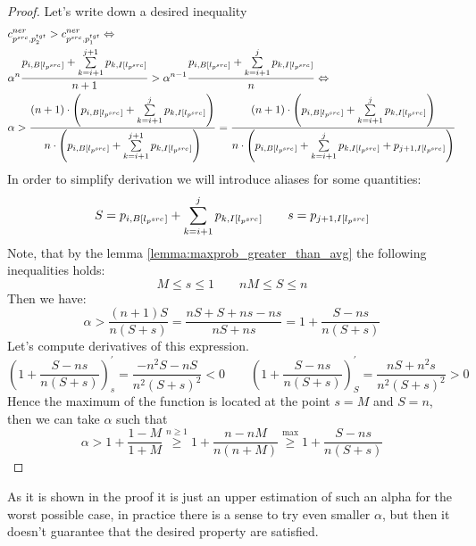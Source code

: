 \begin{proof} Let's write down a desired inequality
  \begin{align*}
    & c_{p^{src}, p_2^{tgt}}^{ner} > c_{p^{src}, p_1^{tgt}}^{ner} \Leftrightarrow \\
    & \alpha^{n}
    \frac{
      p_{i, B[l_{p^{src}}]} +
      \sum\limits_{k = i + 1}^{j + 1} p_{k, I[l_{p^{src}}]}
    }
    {n + 1} >
    \alpha^{n - 1}
    \frac{
      p_{i, B[l_{p^{src}}]} +
      \sum\limits_{k = i + 1}^{j} p_{k, I[l_{p^{src}}]}
    }
    {n}
    \Leftrightarrow                                                                \\
    & \alpha >
    \frac
    {(n+1) \cdot \left( p_{i, B[l_{p^{src}}]} +
    \sum\limits_{k = i + 1}^{j} p_{k, I[l_{p^{src}}]} \right)}
    {
      n \cdot \left( p_{i, B[l_{p^{src}}]} +
    \sum\limits_{k = i + 1}^{j + 1} p_{k, I[l_{p^{src}}]} \right)}
    =
    \frac
    {(n+1) \cdot \left( p_{i, B[l_{p^{src}}]} +
    \sum\limits_{k = i + 1}^{j} p_{k, I[l_{p^{src}}]} \right)}
    {
      n \cdot \left( p_{i, B[l_{p^{src}}]} +
    \sum\limits_{k = i + 1}^{j} p_{k, I[l_{p^{src}}]} + p_{j+1, I[l_{p^{src}}]} \right)}
  \end{align*}
  In order to simplify derivation we will introduce aliases for some quantities:
  \[
    S = p_{i, B[l_{p^{src}}]}  + \sum\limits_{k = i + 1}^{j} p_{k, I[l_{p^{src}}]} \qquad
    s = p_{j+1, I[l_{p^{src}}]}
  \]
  Note, that by the lemma \ref{lemma:maxprob_greater_than_avg} the following
  inequalities holds:
  \begin{equation} \label{eq:ner_sum_ineq}
    M \leq s \leq 1 \qquad nM \leq S \leq n
  \end{equation}
  Then we have:
  \begin{equation*}
    \alpha > \frac{(n + 1) S}{n (S + s)} =
    \frac{nS + S + ns - ns}{nS + ns} =
    1 + \frac{S - ns}{n(S + s)}
  \end{equation*}
  Let's compute derivatives of this expression.
  \begin{equation*}
    \left( 1 + \frac{S - ns}{n(S + s)} \right)_s^{'} =
    \frac{-n^2S - nS}{n^2 (S + s)^2} < 0
    \qquad
    \left( 1 + \frac{S - ns}{n(S + s)} \right)_S^{'}
    = \frac{nS + n^2s}{n^2 (S + s)^2} > 0
  \end{equation*}
  Hence the maximum of the function is located at the point
  \( s = M \) and \( S = n \), then we can take \( \alpha \) such that
  \begin{equation*}
    \alpha > 1 + \frac{1 - M}{1 + M}
    \stackrel{n \geq 1}{\geq}
    1 + \frac{n - nM}{n(n + M)}
    \stackrel{\max}{\geq}
    1 + \frac{S - ns}{n(S + s)}
  \end{equation*}
\end{proof}
As it is shown in the proof it is just an upper estimation of such an alpha for the worst possible case,
in practice there is a sense to try even smaller \( \alpha \), but then it doesn't guarantee that the
desired property are satisfied.

